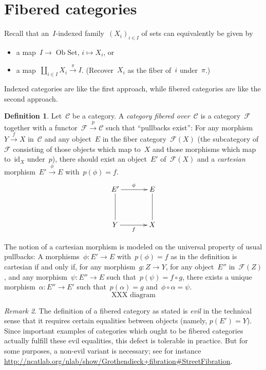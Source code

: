 \documentclass[a4paper,english,12pt]{scrartcl}
\theoremstyle{definition}
\newtheorem{defn}{Definition}[section]
\theoremstyle{plain}
\theoremstyle{remark}
\newtheorem{rem}[defn]{Remark}
\newcommand{\C}{\mathcal{C}}
\newcommand{\F}{\mathcal{F}}
\newcommand{\id}{\mathrm{id}}
\newcommand{\xra}[1]{\xrightarrow{#1}}
\newcommand{\Set}{\mathrm{Set}}
\newcommand{\Ob}{\operatorname{Ob}}
\begin{document}
\section{Fibered categories}

Recall that an~$I$-indexed family~$(X_i)_{i \in I}$ of sets can equivalently be
given by
\begin{itemize}
\item a map~$I \to \Ob\Set$, $i \mapsto X_i$, or
\item a map~$\coprod_{i \in I} X_i \xra{\pi} I$. (Recover~$X_i$ as the fiber
of~$i$ under~$\pi$.)
\end{itemize}
Indexed categories are like the first approach, while fibered categories are
like the second approach.

\begin{defn}Let~$\C$ be a category. A \emph{category fibered over~$\C$} is a
category~$\F$ together with a functor~$\F \xra{p} \C$ such that ``pullbacks
exist'': For any morphism~$Y \xra{f} X$ in~$\C$ and any object~$E$ in the fiber
category~$\F(X)$ (the subcategory of~$\F$ consisting of those objects which map
to~$X$ and those morphisms which map to~$\id_X$ under~$p$), there should
exist an object~$E'$ of~$\F(X)$ and a \emph{cartesian} morphism~$E' \xra{\phi}
E$ with~$p(\phi) = f$.
\[ \xymatrixcolsep{3pc}\xymatrixrowsep{3pc}\xymatrix{
  E' \ar@{-}[d] \ar^\phi[r] & E \ar@{-}[d] \\
  Y \ar[r]_f & X
} \]
\end{defn}

The notion of a cartesian morphism is modeled on the universal property of
usual pullbacks: A morphisms~$\phi : E' \to E$ with~$p(\phi) = f$ as in the
definition is cartesian if and only if, for any morphism~$g : Z \to Y$, for any
object~$E''$ in~$\F(Z)$, and any morphism~$\psi : E'' \to E$ such that~$p(\psi)
= f \circ g$, there exists a unique morphism~$\alpha : E'' \to E'$ such
that~$p(\alpha) = g$ and~$\phi \circ \alpha = \psi$.
\[ \text{XXX diagram} \]

\begin{rem}The definition of a fibered category as stated is \emph{evil} in the
technical sense that it requires certain equalities between objects (namely,
$p(E') = Y$). Since important examples of categories which ought to be fibered
categories actually fulfill these evil equalities, this defect is tolerable in
practice. But for some purposes, a non-evil variant is necessary; see for
instance
\url{http://ncatlab.org/nlab/show/Grothendieck+fibration#StreetFibration}.\end{rem}
\end{document}
